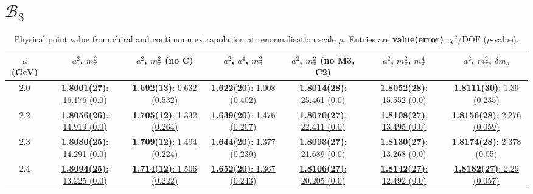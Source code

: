 \documentclass[12pt]{extarticle}
\begin{document}
\section{$\mathcal{B}_3$}
\begin{table}[h!]
\begin{center}
\begin{tabular}{|c|c|c|c|c|c|c|}
\hline
$\mu$ (GeV) & $a^2$, $m_\pi^2$& $a^2$, $m_\pi^2$ (no C)& $a^2$, $a^4$, $m_\pi^2$& $a^2$, $m_\pi^2$ (no M3, C2)& $a^2$, $m_\pi^2$, $m_\pi^4$& $a^2$, $m_\pi^2$, $\delta m_s$\\
\hline
2.0& \hyperlink{SSmPP/NPR/a2m2_20.pdf.1}{\textbf{1.8001(27)}: 16.176 (0.0)} & \hyperlink{SSmPP/NPR/a2m2noC_20.pdf.1}{\textbf{1.692(13)}: 0.632 (0.532)} & \hyperlink{SSmPP/NPR/a2a4m2_20.pdf.1}{\textbf{1.622(20)}: 1.008 (0.402)} & \hyperlink{SSmPP/NPR/a2m2mcut_20.pdf.1}{\textbf{1.8014(28)}: 25.461 (0.0)} & \hyperlink{SSmPP/NPR/a2m2m4_20.pdf.1}{\textbf{1.8052(28)}: 15.552 (0.0)} & \hyperlink{SSmPP/NPR/a2m2delm_20.pdf.1}{\textbf{1.8111(30)}: 1.39 (0.235)}\\
2.2& \hyperlink{SSmPP/NPR/a2m2_22.pdf.1}{\textbf{1.8056(26)}: 14.919 (0.0)} & \hyperlink{SSmPP/NPR/a2m2noC_22.pdf.1}{\textbf{1.705(12)}: 1.332 (0.264)} & \hyperlink{SSmPP/NPR/a2a4m2_22.pdf.1}{\textbf{1.639(20)}: 1.476 (0.207)} & \hyperlink{SSmPP/NPR/a2m2mcut_22.pdf.1}{\textbf{1.8070(27)}: 22.411 (0.0)} & \hyperlink{SSmPP/NPR/a2m2m4_22.pdf.1}{\textbf{1.8108(27)}: 13.495 (0.0)} & \hyperlink{SSmPP/NPR/a2m2delm_22.pdf.1}{\textbf{1.8156(28)}: 2.276 (0.059)}\\
2.3& \hyperlink{SSmPP/NPR/a2m2_23.pdf.1}{\textbf{1.8080(25)}: 14.291 (0.0)} & \hyperlink{SSmPP/NPR/a2m2noC_23.pdf.1}{\textbf{1.709(12)}: 1.494 (0.224)} & \hyperlink{SSmPP/NPR/a2a4m2_23.pdf.1}{\textbf{1.644(20)}: 1.377 (0.239)} & \hyperlink{SSmPP/NPR/a2m2mcut_23.pdf.1}{\textbf{1.8093(27)}: 21.689 (0.0)} & \hyperlink{SSmPP/NPR/a2m2m4_23.pdf.1}{\textbf{1.8130(27)}: 13.268 (0.0)} & \hyperlink{SSmPP/NPR/a2m2delm_23.pdf.1}{\textbf{1.8174(28)}: 2.378 (0.05)}\\
2.4& \hyperlink{SSmPP/NPR/a2m2_24.pdf.1}{\textbf{1.8094(25)}: 13.225 (0.0)} & \hyperlink{SSmPP/NPR/a2m2noC_24.pdf.1}{\textbf{1.714(12)}: 1.506 (0.222)} & \hyperlink{SSmPP/NPR/a2a4m2_24.pdf.1}{\textbf{1.652(20)}: 1.367 (0.243)} & \hyperlink{SSmPP/NPR/a2m2mcut_24.pdf.1}{\textbf{1.8106(27)}: 20.205 (0.0)} & \hyperlink{SSmPP/NPR/a2m2m4_24.pdf.1}{\textbf{1.8142(27)}: 12.492 (0.0)} & \hyperlink{SSmPP/NPR/a2m2delm_24.pdf.1}{\textbf{1.8182(27)}: 2.29 (0.057)}\\
\hline
\end{tabular}
\caption{Physical point value from chiral and continuum extrapolation at renormalisation scale $\mu$. Entries are \textbf{value(error)}: $\chi^2/\text{DOF}$ ($p$-value).}
\end{center}
\end{table}
\end{document}
